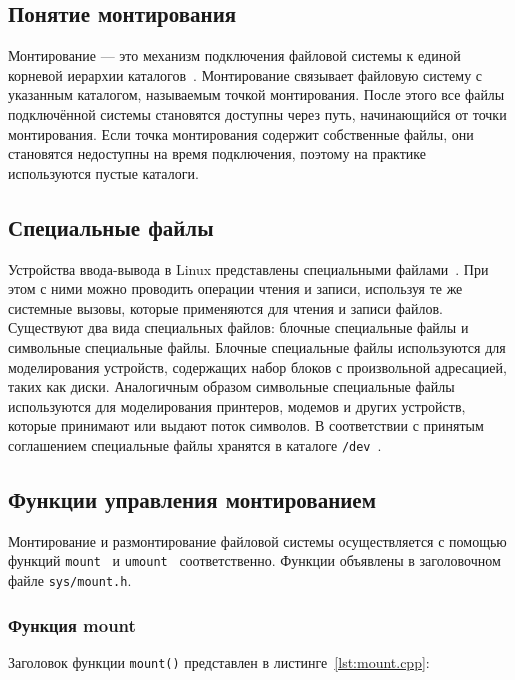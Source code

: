 \subsection{Понятие монтирования}

Монтирование --- это механизм подключения файловой системы к единой корневой иерархии каталогов~\cite{TannenBaum}. 
Монтирование связывает файловую систему с указанным каталогом, называемым точкой монтирования. 
После этого все файлы подключённой системы становятся доступны через путь, начинающийся от точки монтирования. 
Если точка монтирования содержит собственные файлы, они становятся недоступны на время подключения, поэтому на 
практике используются пустые каталоги.

\subsection{Специальные файлы}

Устройства ввода-вывода в Linux представлены специальными файлами~\cite{TannenBaum}. При
этом с ними можно проводить операции чтения и записи, используя те же системные вызовы, которые 
применяются для чтения и записи файлов. Существуют два вида специальных файлов: блочные 
специальные файлы и символьные специальные файлы. Блочные специальные файлы используются для 
моделирования устройств, содержащих набор блоков с произвольной адресацией, таких как диски. 
Аналогичным образом символьные специальные файлы используются для моделирования принтеров, 
модемов и других устройств, которые принимают или выдают поток символов. В соответствии с принятым 
соглашением специальные файлы хранятся в каталоге \texttt{/dev}~\cite{FHS}. 

\subsection{Функции управления монтированием}

Монтирование и размонтирование файловой системы осуществляется с помощью функций \texttt{mount}~\cite{Mount} и 
\texttt{umount}~\cite{Umount} соответственно. Функции объявлены в заголовочном файле \texttt{sys/mount.h}.

\subsubsection{Функция mount}

Заголовок функции \texttt{mount()} представлен в листинге~\ref{lst:mount.cpp}: 

